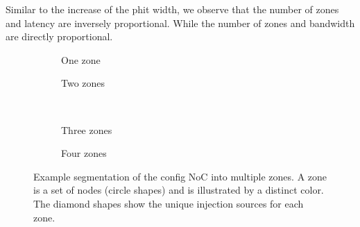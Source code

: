 Similar to the increase of the phit width, we observe that the number of zones and latency are inversely proportional. While the number of zones and bandwidth are directly proportional.

\begin{figure}[htbp]
    \centering
    \begin{subfigure}[b]{0.48\linewidth}
        \centering
        \begin{adjustbox}{width=0.6\linewidth}
            
        \end{adjustbox}
        \caption{One zone}
        \label{fig:segmentation_example_1}
    \end{subfigure}
    \hfill
    \begin{subfigure}[b]{0.48\linewidth}
        \centering
        \begin{adjustbox}{width=0.6\linewidth}
            
        \end{adjustbox}
        \caption{Two zones}
        \label{fig:segmentation_example_2}
    \end{subfigure}
    \\ \vspace{1.5em}
    \begin{subfigure}[b]{0.48\linewidth}
        \centering
        \begin{adjustbox}{width=0.6\linewidth}
            
        \end{adjustbox}
        \caption{Three zones}
        \label{fig:segmentation_example_3}
    \end{subfigure}
    \hfill
    \begin{subfigure}[b]{0.48\linewidth}
        \centering
        \begin{adjustbox}{width=0.6\linewidth}
            
        \end{adjustbox}
        \caption{Four zones}
        \label{fig:segmentation_example_4}
    \end{subfigure}
    \caption{
    Example segmentation of the config NoC into multiple zones.
    A zone is a set of nodes (circle shapes) and is illustrated by a distinct color.
    The diamond shapes show the unique injection sources for each zone.
    }
    \label{fig:segmentation_example}
\end{figure}


